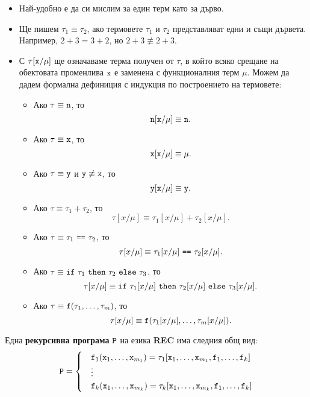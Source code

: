 \begin{itemize}
\item
  Най-удобно е да си мислим за един терм като за дърво.
\item
  Ще пишем $\tau_1 \equiv \tau_2$, ако термовете $\tau_1$ и $\tau_2$ представляват едни и същи дървета.
  Например, $2+3 = 3+2$, но $2+3 \not\equiv 2+3$.
\item
  С $\tau[\texttt{x}/\mu]$ ще означаваме терма получен от $\tau$, в който всяко срещане на обектовата променлива $\texttt{x}$
  е заменена с функционалния терм $\mu$. Можем да дадем формална дефиниция с индукция по построението на термовете:
  \begin{itemize}
  \item
    Ако $\tau \equiv \texttt{n}$, то
    \[\texttt{n}[\texttt{x}/\mu] \equiv \texttt{n}.\]
  \item
    Ако $\tau \equiv \texttt{x}$, то
    \[\texttt{x}[\texttt{x}/\mu] \equiv \mu.\]
  \item
    Ако $\tau \equiv \texttt{y}$ и $\texttt{y} \not\equiv \texttt{x}$, то
    \[\texttt{y}[\texttt{x}/\mu] \equiv \texttt{y}.\]
  \item
    Ако $\tau \equiv \tau_1 + \tau_2$, то
    \[\tau[x/\mu] \equiv \tau_1[x/\mu] + \tau_2[x/\mu].\]
  \item
    Ако $\tau \equiv \tau_1\ \vv{==}\ \tau_2$, то
    \[\tau[x/\mu] \equiv \tau_1[x/\mu]\ \texttt{==}\ \tau_2[x/\mu].\]
  \item
    Ако $\tau \equiv \texttt{if}\ \tau_1\ \texttt{then}\ \tau_2\ \texttt{else}\ \tau_3$, то
    \[\tau[x/\mu] \equiv \texttt{if}\ \tau_1[x/\mu]\ \texttt{then}\ \tau_2[x/\mu]\ \texttt{else}\ \tau_3[x/\mu].\]
  \item
    Ако $\tau \equiv \texttt{f}(\tau_1,\dots,\tau_m)$, то
    \[\tau[x/\mu] \equiv \texttt{f}(\tau_1[x/\mu], \dots, \tau_m[x/\mu]).\]
  \end{itemize}  
\end{itemize}


Една {\bf рекурсивна програма} $\texttt{P}$ на езика {\bf REC} има следния общ вид:
\begin{align*}
  \texttt{P} = 
  \begin{cases}
    & \texttt{f}_1(\texttt{x}_1,\dots,\texttt{x}_{m_1}) = \tau_1[\texttt{x}_1,\dots,\texttt{x}_{m_1},\texttt{f}_1,\dots,\texttt{f}_k]\\
    & \vdots\\
    & \texttt{f}_k(\texttt{x}_1,\dots,\texttt{x}_{m_k}) = \tau_k[\texttt{x}_1,\dots,\texttt{x}_{m_k},\texttt{f}_1,\dots,\texttt{f}_k]
  \end{cases}
\end{align*}

